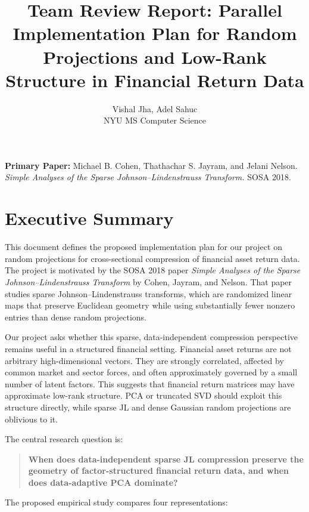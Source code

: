 \documentclass[11pt]{article}
\title{\textbf{Team Review Report: Parallel Implementation Plan for Random Projections and Low-Rank Structure in Financial Return Data}}
\author{Vishal Jha, Adel Sahuc \\ NYU MS Computer Science}
\date{}
\begin{document}
\maketitle

\vspace{-1.0em}

\begin{center}
\textbf{Primary Paper:} Michael B. Cohen, Thathachar S. Jayram, and Jelani Nelson. \\
\emph{Simple Analyses of the Sparse Johnson--Lindenstrauss Transform.} SOSA 2018.
\end{center}

\tableofcontents
\newpage

\section{Executive Summary}

This document defines the proposed implementation plan for our project on random projections for cross-sectional compression of financial asset return data. The project is motivated by the SOSA 2018 paper \emph{Simple Analyses of the Sparse Johnson--Lindenstrauss Transform} by Cohen, Jayram, and Nelson. That paper studies sparse Johnson--Lindenstrauss transforms, which are randomized linear maps that preserve Euclidean geometry while using substantially fewer nonzero entries than dense random projections.

Our project asks whether this sparse, data-independent compression perspective remains useful in a structured financial setting. Financial asset returns are not arbitrary high-dimensional vectors. They are strongly correlated, affected by common market and sector forces, and often approximately governed by a small number of latent factors. This suggests that financial return matrices may have approximate low-rank structure. PCA or truncated SVD should exploit this structure directly, while sparse JL and dense Gaussian random projections are oblivious to it.

The central research question is:

\begin{quote}
\textbf{When does data-independent sparse JL compression preserve the geometry of factor-structured financial return data, and when does data-adaptive PCA dominate?}
\end{quote}

The proposed empirical study compares four representations:
\end{document}
